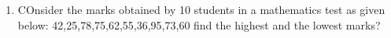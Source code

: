 \renewcommand{\theequation}{\theenumi}
\begin{enumerate}[label=\arabic*.,ref=\thesubsection.\theenumi]
\item COnsider the marks obtained by 10 students in a mathematics test as given below:
42,25,78,75,62,55,36,95,73,60
find the highest and the lowest marks?
\end{enumerate}
